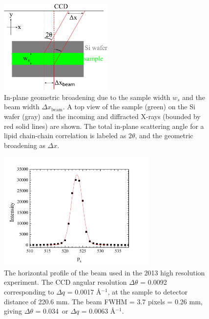 \begin{figure}[htbp]
  \centering
  \includegraphics[width=0.5\textwidth]{figures/ripple/MMs/waxs/geometric_broadening}
  \caption{In-plane geometric broadening due to the sample width $w_s$ and the beam width $\Delta x_\textrm{beam}$.
  A top view of the sample (green) on the Si wafer (gray) and the
  incoming and diffracted X-rays (bounded by red solid lines)
  are shown. The total in-plane scattering
  angle for a lipid chain-chain correlation is labeled as $2\theta$, and 
  the geometric broadening as $\Delta x$.}
  \label{fig:geometric_broadening}
\end{figure}

\begin{figure}[htbp]
  \centering
  \includegraphics[width=0.7\textwidth]{figures/ripple/MMs/waxs/beamx_hr}
  \caption{The horizontal profile of the beam used in the 2013 high resolution 
  experiment. The CCD angular resolution $\Delta\theta$ = 0.0092\textdegree\,
  corresponding to $\Delta q$ = 0.0017 \AA$^{-1}$, at the sample to detector
  distance of 220.6 mm. The beam FWHM = 3.7 pixels = 0.26 mm, giving
  $\Delta\theta$ = 0.034\textdegree\ or $\Delta q$ = 0.0063 \AA$^{-1}$. }
  \label{fig:nGIWAXS_beamx}
\end{figure} 

